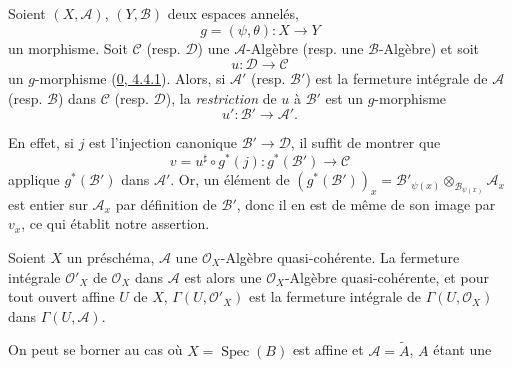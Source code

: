 \begin{env}[6.3.3]
\label{II.6.3.3-fr}
Soient $(X,\mathcal{A})$, $(Y,\mathcal{B})$ deux espaces annelés,
\[
g=(\psi,\theta):X\to Y
\]
un morphisme. Soit $\mathcal{C}$ (resp. $\mathcal{D}$) une
$\mathcal{A}$-Algèbre (resp. une $\mathcal{B}$-Algèbre) et soit
\[
u:\mathcal{D}\to\mathcal{C}
\]
un $g$-morphisme (\hyperref[0.4.4.1-fr]{0, 4.4.1}). Alors, si
$\mathcal{A}'$ (resp. $\mathcal{B}'$) est la fermeture intégrale de
$\mathcal{A}$ (resp. $\mathcal{B}$) dans $\mathcal{C}$ (resp.
$\mathcal{D}$), la \emph{restriction} de $u$ à $\mathcal{B}'$ est un
$g$-morphisme
\[
u':\mathcal{B}'\to\mathcal{A}'.
\]

En effet, si $j$ est l'injection canonique $\mathcal{B}'\to\mathcal{D}$, il
suffit de montrer que
\[
v=u^\sharp\circ g^*(j):g^*(\mathcal{B}')\to\mathcal{C}
\]
applique $g^*(\mathcal{B}')$ dans $\mathcal{A}'$. Or, un élément de
$(g^*(\mathcal{B}'))_x=\mathcal{B}'_{\psi(x)}\otimes_{\mathcal{B}_{\psi(x)}}
\mathcal{A}_x$ est entier sur $\mathcal{A}_x$ par définition de
$\mathcal{B}'$, donc il en est de même de son image par $v_x$, ce qui établit
notre assertion.
\end{env}

\begin{proposition}[6.3.4]
\label{II.6.3.4-fr}
Soient $X$ un préschéma, $\mathcal{A}$ une $\mathcal{O}_X$-Algèbre
quasi-cohérente. La fermeture intégrale $\mathcal{O}'_X$ de
$\mathcal{O}_X$ dans $\mathcal{A}$ est alors une $\mathcal{O}_X$-Algèbre
quasi-cohérente, et pour tout ouvert affine $U$ de $X$,
$\Gamma(U,\mathcal{O}'_X)$ est la fermeture intégrale de
$\Gamma(U,\mathcal{O}_X)$ dans $\Gamma(U,\mathcal{A})$.
\end{proposition}

On peut se borner au cas où $X=\operatorname{Spec}(B)$ est affine et
$\mathcal{A}=\widetilde{A}$, $A$ étant une

